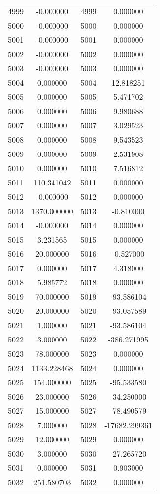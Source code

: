 \documentclass[12pt]{article}
\begin{document}
\begin{longtable}{@{}cccc@{}}
4999 & -0.000000 & 4999 & 0.000000 \\
5000 & -0.000000 & 5000 & 0.000000 \\
5001 & -0.000000 & 5001 & 0.000000 \\
5002 & -0.000000 & 5002 & 0.000000 \\
5003 & -0.000000 & 5003 & 0.000000 \\
5004 & 0.000000 & 5004 & 12.818251 \\
5005 & 0.000000 & 5005 & 5.471702 \\
5006 & 0.000000 & 5006 & 9.980688 \\
5007 & 0.000000 & 5007 & 3.029523 \\
5008 & 0.000000 & 5008 & 9.543523 \\
5009 & 0.000000 & 5009 & 2.531908 \\
5010 & 0.000000 & 5010 & 7.516812 \\
5011 & 110.341042 & 5011 & 0.000000 \\
5012 & -0.000000 & 5012 & 0.000000 \\
5013 & 1370.000000 & 5013 & -0.810000 \\
5014 & -0.000000 & 5014 & 0.000000 \\
5015 & 3.231565 & 5015 & 0.000000 \\
5016 & 20.000000 & 5016 & -0.527000 \\
5017 & 0.000000 & 5017 & 4.318000 \\
5018 & 5.985772 & 5018 & 0.000000 \\
5019 & 70.000000 & 5019 & -93.586104 \\
5020 & 20.000000 & 5020 & -93.057589 \\
5021 & 1.000000 & 5021 & -93.586104 \\
5022 & 3.000000 & 5022 & -386.271995 \\
5023 & 78.000000 & 5023 & 0.000000 \\
5024 & 1133.228468 & 5024 & 0.000000 \\
5025 & 154.000000 & 5025 & -95.533580 \\
5026 & 23.000000 & 5026 & -34.250000 \\
5027 & 15.000000 & 5027 & -78.490579 \\
5028 & 7.000000 & 5028 & -17682.299361 \\
5029 & 12.000000 & 5029 & 0.000000 \\
5030 & 3.000000 & 5030 & -27.265720 \\
5031 & 0.000000 & 5031 & 0.903000 \\
5032 & 251.580703 & 5032 & 0.000000 \\

\end{longtable}
\end{document}
